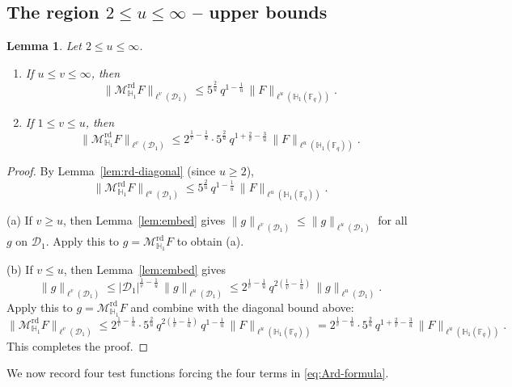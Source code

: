 \documentclass[11pt]{article}
\newtheorem{lemma}[theorem]{Lemma}
\newcommand{\1}{\mathbf 1}
\begin{document}
\subsection{The region $2\le u\le \infty$ -- upper bounds}
\begin{lemma}\label{lem:rd-upper-u-ge-2}
Let $2\le u\le\infty$.
\begin{enumerate}[label=\emph{(\alph*)},itemsep=0.3em]
\item If $u\le v\le\infty$, then
\[
\|\mathcal{M}^{\mathrm{rd}}_{\mathbb H_1}F\|_{\ell^v(\mathcal D_1)}
\leq 5^{\frac{2}{u}} \,
q^{1-\frac{1}{u}}\,
\|F\|_{\ell^u(\mathbb H_1(\mathbb F_q))}.
\]
\item If $1\le v\le u$, then
\[
\|\mathcal{M}^{\mathrm{rd}}_{\mathbb H_1}F\|_{\ell^v(\mathcal D_1)}
\leq  2^{\frac{1}{v}-\frac{1}{u}} \cdot 5^{\frac{2}{u}} \, 
q^{1+\frac{2}{v}-\frac{3}{u}}\,
\|F\|_{\ell^u(\mathbb H_1(\mathbb F_q))}.
\]
\end{enumerate}
\end{lemma}

\begin{proof}
By Lemma~\ref{lem:rd-diagonal} (since $u\ge 2$),
\[
\|\mathcal{M}^{\mathrm{rd}}_{\mathbb H_1}F\|_{\ell^u(\mathcal D_1)}
\leq 5^{\frac{2}{u}} \,
q^{1-\frac{1}{u}}\,
\|F\|_{\ell^u(\mathbb H_1(\mathbb F_q))}.
\]

\noindent (a) 
If $v\ge u$, then Lemma~\ref{lem:embed} gives
$\|g\|_{\ell^v(\mathcal D_1)}\le \|g\|_{\ell^u(\mathcal D_1)}$ for all $g$ on $\mathcal D_1$.
Apply this to $g=\mathcal{M}^{\mathrm{rd}}_{\mathbb H_1}F$ to obtain (a).

\noindent (b)
If $v\le u$, then Lemma~\ref{lem:embed} gives
\[
\|g\|_{\ell^v(\mathcal D_1)}
\le
|\mathcal D_1|^{\frac{1}{v}-\frac{1}{u}}\,
\|g\|_{\ell^u(\mathcal D_1)}
\leq 2^{\frac{1}{v}-\frac{1}{u}} \,
q^{2(\frac{1}{v}-\frac{1}{u})}\,\|g\|_{\ell^u(\mathcal D_1)}.
\]
Apply this to $g=\mathcal{M}^{\mathrm{rd}}_{\mathbb H_1}F$ and combine with the diagonal bound above:
\[
\|\mathcal{M}^{\mathrm{rd}}_{\mathbb H_1}F\|_{\ell^v(\mathcal D_1)}
\leq  2^{\frac{1}{v}-\frac{1}{u}} \cdot 5^{\frac{2}{u}} \, 
q^{2(\frac{1}{v}-\frac{1}{u})}\,q^{1-\frac{1}{u}}\,
\|F\|_{\ell^u(\mathbb H_1(\mathbb F_q))}
= 2^{\frac{1}{v}-\frac{1}{u}} \cdot 5^{\frac{2}{u}} \, 
q^{1+\frac{2}{v}-\frac{3}{u}}\,
\|F\|_{\ell^u(\mathbb H_1(\mathbb F_q))}.
\]
This completes the proof.
\end{proof}




We now record four test functions forcing the four terms in \eqref{eq:Ard-formula}. 
\end{document}
